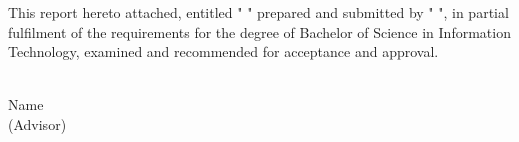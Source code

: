 This report hereto attached, entitled " " prepared and submitted by " ", in partial fulfilment of the requirements for the degree of Bachelor of Science in Information Technology, examined and recommended for acceptance and approval. 
\bigskip
\bigskip
\bigskip

 \\Name  \\ (Advisor)\\

